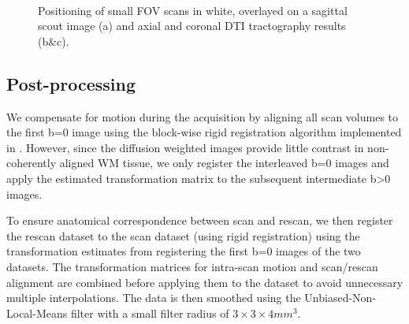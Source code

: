 \begin{figure}[ht]
	\centering
	\begin{minipage}{0.35\textwidth}
	\\
	\end{minipage}\hspace{0.05\textwidth}
	\begin{minipage}{0.53\textwidth}
	\end{minipage}
	
	\caption{Positioning of small FOV scans in white, overlayed on a sagittal scout image (a) and axial and coronal DTI tractography results (b\&c).}
	\label{fig:chap9 FOV positioning}	
\end{figure}
\subsection{Post-processing}
We compensate for motion during the acquisition by aligning all scan volumes to the first b=0 image using the block-wise rigid registration algorithm \citep{Ourselin:2001} implemented in \citep{Modat:2010}. However, since the diffusion weighted images provide little contrast in non-coherently aligned WM tissue, we only register the interleaved b=0 images and apply the estimated transformation matrix to the subsequent intermediate b>0 images.   

To ensure anatomical correspondence between scan and rescan, we then register the rescan dataset to the scan dataset (using rigid registration) using the transformation estimates from registering  the first b=0 images of the two datasets. The transformation matrices for intra-scan motion and scan/rescan alignment are combined before applying them to the dataset to avoid unnecessary multiple interpolations. The data is then smoothed using the Unbiased-Non-Local-Means filter \citep{Tristan-Vega:2012} with a small filter radius of $3\times3\times4 mm^3$.

